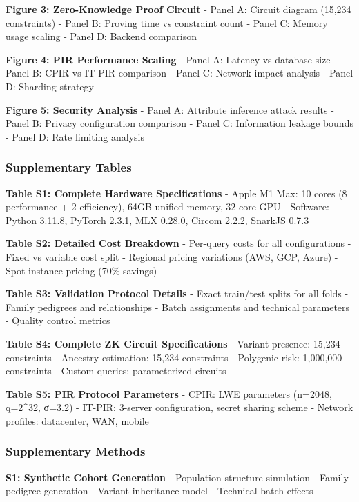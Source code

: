 \documentclass[
  11pt,
]{article}
\begin{document}
\textbf{Figure 3: Zero-Knowledge Proof Circuit} - Panel A: Circuit
diagram (15,234 constraints) - Panel B: Proving time vs constraint count
- Panel C: Memory usage scaling - Panel D: Backend comparison

\textbf{Figure 4: PIR Performance Scaling} - Panel A: Latency vs
database size - Panel B: CPIR vs IT-PIR comparison - Panel C: Network
impact analysis - Panel D: Sharding strategy

\textbf{Figure 5: Security Analysis} - Panel A: Attribute inference
attack results - Panel B: Privacy configuration comparison - Panel C:
Information leakage bounds - Panel D: Rate limiting analysis

\subsubsection{Supplementary Tables}\label{supplementary-tables}

\textbf{Table S1: Complete Hardware Specifications} - Apple M1 Max: 10
cores (8 performance + 2 efficiency), 64GB unified memory, 32-core GPU -
Software: Python 3.11.8, PyTorch 2.3.1, MLX 0.28.0, Circom 2.2.2,
SnarkJS 0.7.3

\textbf{Table S2: Detailed Cost Breakdown} - Per-query costs for all
configurations - Fixed vs variable cost split - Regional pricing
variations (AWS, GCP, Azure) - Spot instance pricing (70\% savings)

\textbf{Table S3: Validation Protocol Details} - Exact train/test splits
for all folds - Family pedigrees and relationships - Batch assignments
and technical parameters - Quality control metrics

\textbf{Table S4: Complete ZK Circuit Specifications} - Variant
presence: 15,234 constraints - Ancestry estimation: 15,234 constraints -
Polygenic risk: 1,000,000 constraints - Custom queries: parameterized
circuits

\textbf{Table S5: PIR Protocol Parameters} - CPIR: LWE parameters
(n=2048, q=2\^{}32, σ=3.2) - IT-PIR: 3-server configuration, secret
sharing scheme - Network profiles: datacenter, WAN, mobile

\subsubsection{Supplementary Methods}\label{supplementary-methods}

\textbf{S1: Synthetic Cohort Generation} - Population structure
simulation - Family pedigree generation - Variant inheritance model -
Technical batch effects
\end{document}
